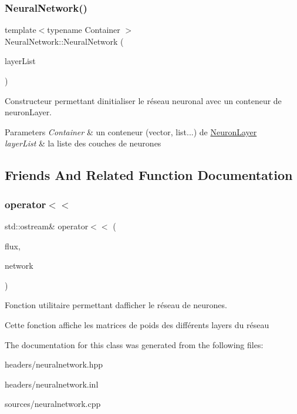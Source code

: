 \subsubsection{\texorpdfstring{Neural\+Network()}{NeuralNetwork()}\hspace{0.1cm}{\footnotesize\ttfamily [3/3]}}
{\footnotesize\ttfamily template$<$typename Container $>$ \\
Neural\+Network\+::\+Neural\+Network (\begin{DoxyParamCaption}\item[{Container}]{layer\+List }\end{DoxyParamCaption})}



Constructeur permettant d\textquotesingle{}initialiser le réseau neuronal avec un conteneur de neuron\+Layer. 


\begin{DoxyParams}{Parameters}
{\em Container} & un conteneur (vector, list...) de \hyperlink{classNeuronLayer}{Neuron\+Layer} \\
\hline
{\em layer\+List} & la liste des couches de neurones \\
\hline
\end{DoxyParams}


\subsection{Friends And Related Function Documentation}
\mbox{\label{classNeuralNetwork_a0ecebf9a494437efb917804ed271e13f}} 
\subsubsection{\texorpdfstring{operator$<$$<$}{operator<<}}
{\footnotesize\ttfamily std\+::ostream\& operator$<$$<$ (\begin{DoxyParamCaption}\item[{std\+::ostream \&}]{flux,  }\item[{\hyperlink{classNeuralNetwork}{Neural\+Network}}]{network }\end{DoxyParamCaption})\hspace{0.3cm}{\ttfamily [friend]}}



Fonction utilitaire permettant d\textquotesingle{}afficher le réseau de neurones. 

Cette fonction affiche les matrices de poids des différents layers du réseau 

The documentation for this class was generated from the following files\+:\begin{DoxyCompactItemize}
\item 
headers/neuralnetwork.\+hpp\item 
headers/neuralnetwork.\+inl\item 
sources/neuralnetwork.\+cpp\end{DoxyCompactItemize}
